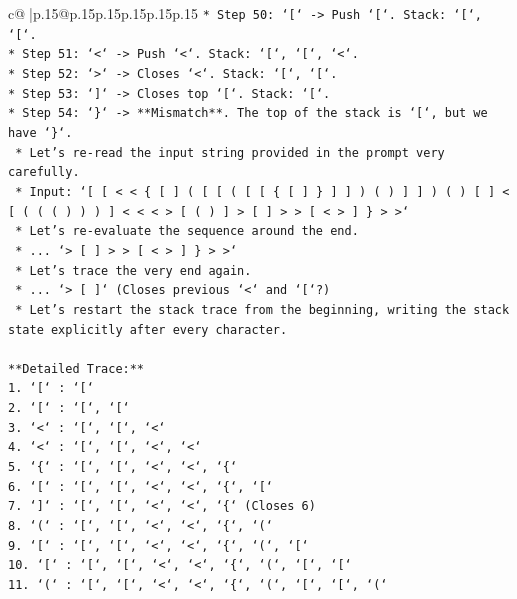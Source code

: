 \documentclass{article}
\begin{document}
{\begin{supertabular}{c@{$\;$}|p{.15\linewidth}@{}p{.15\linewidth}p{.15\linewidth}p{.15\linewidth}p{.15\linewidth}p{.15\linewidth}}
{{{\texttt{*   Step 50: `{[}` {-}> Push `{[}`. Stack: `{[}`, `{[}`.} \\
\texttt{*   Step 51: `<` {-}> Push `<`. Stack: `{[}`, `{[}`, `<`.} \\
\texttt{*   Step 52: `>` {-}> Closes `<`. Stack: `{[}`, `{[}`.} \\
\texttt{*   Step 53: `{]}` {-}> Closes top `{[}`. Stack: `{[}`.} \\
\texttt{*   Step 54: `\}` {-}> **Mismatch**. The top of the stack is `{[}`, but we have `\}`.} \\
\texttt{    *   Let's re{-}read the input string provided in the prompt very carefully.} \\
\texttt{    *   Input: `{[} {[} < < \{ {[} {]} ( {[} {[} ( {[} {[} \{ {[} {]} \} {]} {]} ) ( ) {]} {]} ) ( ) {[} {]} < {[} ( ( ( ) ) ) {]} < < < > {[} ( ) {]} > {[} {]} > > {[} < > {]} \} > >`} \\
\texttt{    *   Let's re{-}evaluate the sequence around the end.} \\
\texttt{    *   ... `> {[} {]} > > {[} < > {]} \} > >`} \\
\texttt{    *   Let's trace the very end again.} \\
\texttt{    *   ... `> {[} {]}` (Closes previous `<` and `{[}`?)} \\
\texttt{    *   Let's restart the stack trace from the beginning, writing the stack state explicitly after every character.} \\
\\ 
\texttt{**Detailed Trace:**} \\
\texttt{1.  `{[}` : `{[}`} \\
\texttt{2.  `{[}` : `{[}`, `{[}`} \\
\texttt{3.  `<` : `{[}`, `{[}`, `<`} \\
\texttt{4.  `<` : `{[}`, `{[}`, `<`, `<`} \\
\texttt{5.  `\{` : `{[}`, `{[}`, `<`, `<`, `\{`} \\
\texttt{6.  `{[}` : `{[}`, `{[}`, `<`, `<`, `\{`, `{[}`} \\
\texttt{7.  `{]}` : `{[}`, `{[}`, `<`, `<`, `\{` (Closes 6)} \\
\texttt{8.  `(` : `{[}`, `{[}`, `<`, `<`, `\{`, `(`} \\
\texttt{9.  `{[}` : `{[}`, `{[}`, `<`, `<`, `\{`, `(`, `{[}`} \\
\texttt{10. `{[}` : `{[}`, `{[}`, `<`, `<`, `\{`, `(`, `{[}`, `{[}`} \\
\texttt{11. `(` : `{[}`, `{[}`, `<`, `<`, `\{`, `(`, `{[}`, `{[}`, `(`} \\
}}}
\end{supertabular}}
\end{document}
